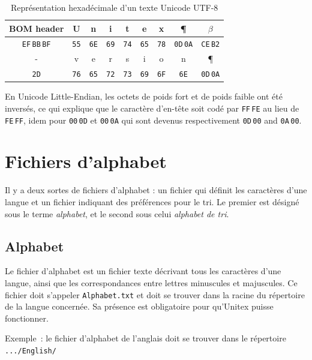 \bigskip
\begin{table}[!ht]
\begin{center}
\begin{tabular}{|c|c|c|c|c|c|c|c|c|}
\hline
BOM header & U & n & i & t & e & x & \P & $\beta$
\\
\hline
\verb+EF+\,\verb+BB+\,\verb+BF+ & \verb+55+ & \verb+6E+ & \verb+69+ & \verb+74+ & \verb+65+ & \verb+78+
& \verb+0D+\,\verb+0A+ & \verb+CE+\,\verb+B2+
\\
\hline
\hline
- & v & e & r & s & i & o & n & \P
\\
\hline
\verb+2D+ & \verb+76+ & \verb+65+ & \verb+72+ & \verb+73+ & \verb+69+ & \verb+6F+
& \verb+6E+ & \verb+0D+\,\verb+0A+
\\
\hline
\end{tabular}
\caption{Représentation hexadécimale d’un texte Unicode UTF-8}
\end{center}
\end{table}

\bigskip
\noindent En Unicode Little-Endian, les octets de poids fort et de poids faible ont été inversés, ce qui explique que le caractère d’en-tête soit codé par \verb+FF+\,\verb+FE+ au lieu de \verb+FE+\,\verb+FF+, idem pour \verb+00+\,\verb+0D+ et \verb+00+\,\verb+0A+ qui sont devenus respectivement \verb+0D+\,\verb+00+ and \verb+0A+\,\verb+00+.



\section{Fichiers d’alphabet}
Il y a deux sortes de fichiers d’alphabet : un fichier qui définit les caractères d’une langue
et un fichier indiquant des préférences pour le tri. Le premier est désigné sous le terme
\textit{alphabet}, et le second sous celui \textit{alphabet de tri}.


\subsection{Alphabet}
Le fichier d’alphabet est un fichier texte décrivant tous les caractères d’une langue, ainsi
que les correspondances entre lettres minuscules et majuscules. Ce fichier doit s’appeler
\verb+Alphabet.txt+  et doit se trouver dans la racine du
répertoire  de la langue concernée. Sa présence est obligatoire pour qu’Unitex puisse fonctionner.


\bigskip
\noindent Exemple~: le fichier d’alphabet de l’anglais doit se trouver dans le répertoire 
\verb+.../English/+


